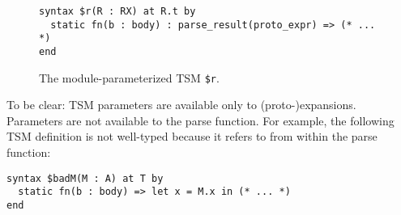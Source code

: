 \begin{figure}[h]
\begin{lstlisting}
syntax $r(R : RX) at R.t by 
  static fn(b : body) : parse_result(proto_expr) => (* ... *)
end
\end{lstlisting}
\caption{The module-parameterized TSM \texttt{\$r}.}
\label{fig:param-tsm-r}
\end{figure}

To be clear: TSM parameters are available only to (proto-)expansions. Parameters are not available to the parse function. For example, the following TSM definition is not well-typed because it refers to  from within the parse function:
\begin{lstlisting}[numbers=none]
syntax $badM(M : A) at T by 
  static fn(b : body) => let x = M.x in (* ... *)
end
\end{lstlisting}



